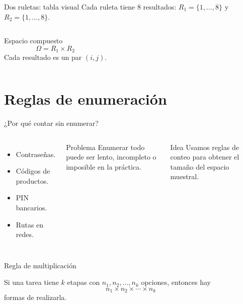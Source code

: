 \documentclass[aspectratio=169,11pt]{beamer}
\begin{document}
\begin{frame}{Dos ruletas: tabla visual}
\small
Cada ruleta tiene 8 resultados: $R_1=\{1,\dots,8\}$ y $R_2=\{1,\dots,8\}$.
\begin{columns}[T]
\begin{block}{Espacio compuesto}
\[
\Omega=R_1\times R_2
\]
Cada resultado es un par $(i,j)$.
\end{block}
\begin{center}
\end{center}
\end{columns}
\end{frame}

\section{Reglas de enumeración}

\begin{frame}{¿Por qué contar sin enumerar?}
\begin{columns}[T]
\begin{itemize}
  \item Contraseñas.
  \item Códigos de productos.
  \item PIN bancarios.
  \item Rutas en redes.
\end{itemize}
\begin{alertblock}{Problema}
Enumerar todo puede ser lento, incompleto o imposible en la práctica.
\end{alertblock}
\begin{exampleblock}{Idea}
Usamos reglas de conteo para obtener el tamaño del espacio muestral.
\end{exampleblock}
\end{columns}
\end{frame}

\begin{frame}{Regla de multiplicación}
\begin{theorem}
Si una tarea tiene $k$ etapas con $n_1,n_2,\ldots,n_k$ opciones, entonces hay
\[
n_1\times n_2\times\cdots\times n_k
\]
formas de realizarla.
\end{theorem}
\pause
{}
\end{frame}
\end{document}
